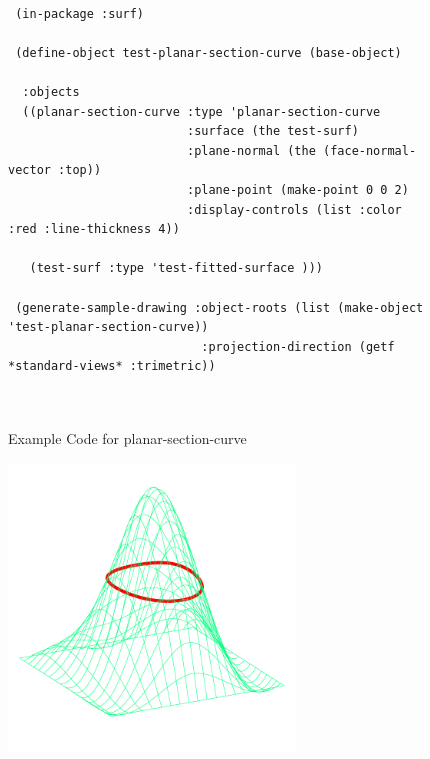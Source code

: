 \documentclass [11pt]{book}
\begin{document}
\begin{itemize}
\begin{description}
\end{description}




\begin{figure}
\begin{lrbox}{\boxedverb}
\begin{minipage}{\linewidth}
{\small

\begin{verbatim}

 (in-package :surf)

 (define-object test-planar-section-curve (base-object)
  
  :objects
  ((planar-section-curve :type 'planar-section-curve
                         :surface (the test-surf)
                         :plane-normal (the (face-normal-vector :top))
                         :plane-point (make-point 0 0 2)
                         :display-controls (list :color :red :line-thickness 4))
   
   (test-surf :type 'test-fitted-surface )))

 (generate-sample-drawing :object-roots (list (make-object 'test-planar-section-curve))
                           :projection-direction (getf *standard-views* :trimetric))

 
\end{verbatim}}
\end{minipage}
\end{lrbox}
\fbox{\usebox{\boxedverb}}

\caption{Example Code for planar-section-curve}

\label{fig:example-code-planar-section-curve}

\end{figure}

\begin{figure}
\begin{center}
\includegraphics[width=3in,height=3in]{../images/example-planar-section-curve.pdf}
\end{center}


\end{figure}
\end{itemize}
\end{document}
